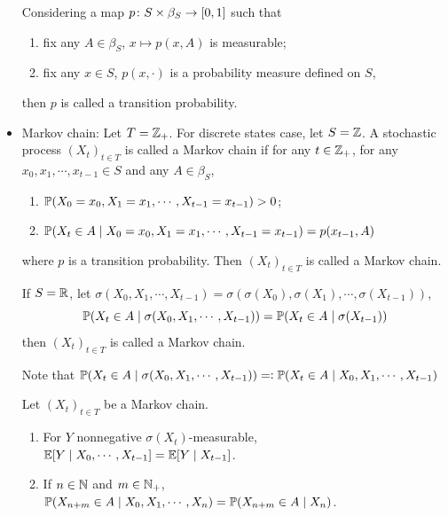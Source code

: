 \documentclass[a4paper,12pt]{article}
\begin{document}
\begin{itemize}
  \noindent Considering a map $p \colon S \times \beta_S \rightarrow [0,1]$ such that
  \begin{enumerate}[label=(\arabic*)]
    \item fix any $A \in \beta_S$, $x \mapsto p(x, A)$ is measurable;
    \item fix any $x \in S$, $p(x, \cdot)$ is a probability measure defined on $S$,
  \end{enumerate}
  then $p$ is called a transition probability.

  \item Markov chain: Let $T = \mathbb{Z}_+$. For discrete states case, let $S = \mathbb{Z}$. A stochastic process $(X_t)_{t \in T}$ is called a Markov chain if for any $t \in \mathbb{Z}_+$, for any $x_0,x_1,\cdots,x_{t-1} \in S$ and any $A \in \beta_S$,
  \begin{enumerate}[label=(\arabic*)]
    \item $\mathbb{P}(X_0 = x_0, X_1=x_1,\cdots,X_{t-1}=x_{t-1}) > 0$;
    \item $\mathbb{P}(X_t \in A \mid X_0 = x_0, X_1=x_1,\cdots,X_{t-1}=x_{t-1}) = p(x_{t-1},A)$
  \end{enumerate}
  where $p$ is a transition probability. Then $(X_t)_{t\in T}$ is called a Markov chain.
  \begin{rmk}
    If $S = \mathbb{R}$, let $\sigma(X_0,X_1,\cdots,X_{t-1}) = \sigma(\sigma(X_0),\sigma(X_1),\cdots,\sigma(X_{t-1}))$,
    \begin{equation*}
      \mathbb{P}(X_t \in A \mid \sigma(X_0,X_1,\cdots,X_{t-1})) = \mathbb{P}(X_t \in A \mid \sigma(X_{t-1}))
    \end{equation*}
    then $(X_t)_{t\in T}$ is called a Markov chain.

  Note that $\mathbb{P}(X_t \in A \mid \sigma(X_0,X_1,\cdots,X_{t-1})) =\vcentcolon \mathbb{P}(X_t \in A \mid X_0,X_1,\cdots,X_{t-1})$
  \end{rmk}
  \begin{prop}
    Let $(X_t)_{t\in T}$ be a Markov chain.
    \begin{enumerate}[label=(\arabic*)]
      \item For $Y$ nonnegative $\sigma(X_t)$-measurable, $\mathbb{E}[Y \mid X_0,\cdots,X_{t-1}] = \mathbb{E}[Y \mid X_{t-1}]$.
      \item If $n\in \mathbb{N}$ and $m\in \mathbb{N}_+$, $\mathbb{P}(X_{n+m} \in A \mid X_0,X_1,\cdots,X_{n})=\mathbb{P}(X_{n+m} \in A \mid X_{n})$.
    \end{enumerate}
  \end{prop}


\end{itemize}
\end{document}

